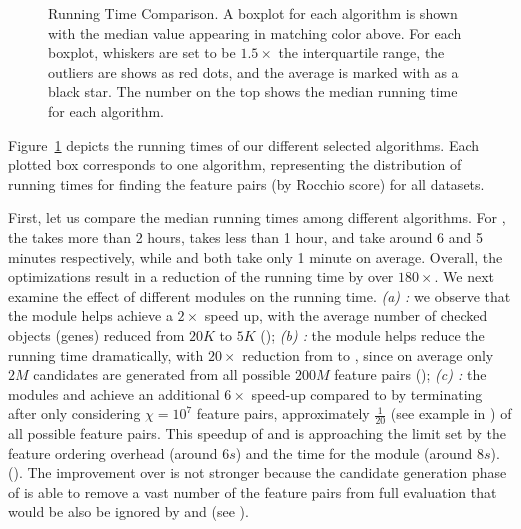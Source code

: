 \begin{figure}[h]
\centering %
{}
\vspace{-5mm}
\caption{Running Time Comparison. A boxplot for each algorithm is shown with the median value appearing in matching color above. For each boxplot, whiskers are set to be $1.5\times$ the interquartile range, the outliers are shows as red dots, and the average is marked with as a black star. The number on the top shows the median running time for each algorithm.}
\vspace{-5mm}
\label{fig:time}
\end{figure}

 Figure~\ref{fig:time} depicts the running times of our different selected algorithms. Each plotted box corresponds to one algorithm, representing the distribution of running times for finding the \topk feature pairs (by Rocchio score) for all datasets.

First, let us compare the median running times among different algorithms. For \msig, the \baseline takes more than 2 hours, \earlyOrder takes less than 1 hour, \samp and \sampOpt take around 6 and 5 minutes respectively, while \horiz and \vertic both take only 1 minute on average. Overall, the optimizations result in a reduction of the running time by over {\bf $180\times$}. We next examine the effect of different modules on the running time. {\em (a) \earlyT:} we observe that the \earlyT module helps achieve a $2\times$ speed up, with the average number of checked objects (genes) reduced from $20K$ to $5K$ (\timetbl); {\em (b) \sampling:} the \sampling module helps reduce the running time dramatically, with $20\times$ reduction from \baseline to \sampOpt, since on average only $2M$ candidates are generated from all possible $200M$ feature pairs (\timetbl);
{\em (c) \traversal:} the modules \horiz and \vertic achieve an additional $6\times$ speed-up compared to \sampOpt by terminating after only considering $\chi=10^7$ feature pairs, approximately $\frac{1}{20}$ (see example in \travnote) of all possible feature pairs. This speedup of \horiz and \vertic is approaching the limit set by the feature ordering overhead (around $6s$) and the time for the \trans module (around $8s$). (\timetbl). The improvement over \sampOpt is not stronger because the candidate generation phase of \sampOpt is able to remove a vast number of the feature pairs from full evaluation that would be also be ignored by \horiz and \vertic (see \timetbl).

